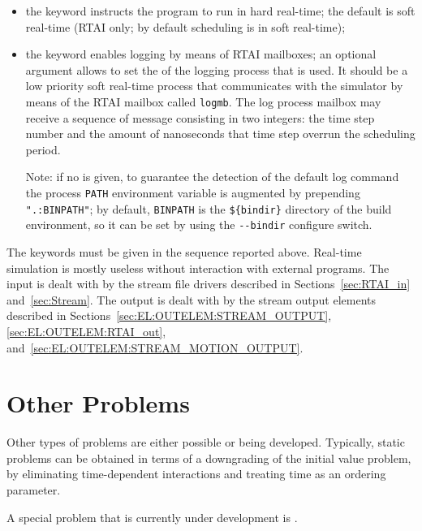 \begin{itemize}
\item the keyword  instructs the program to run
in hard real-time; the default is soft real-time
(RTAI only; by default scheduling is in soft real-time);

\item the keyword  enables logging by means 
of RTAI mailboxes; an optional  argument allows 
to set the  of the logging process that is used.
It should be a low priority soft real-time process that communicates
with the simulator by means of the RTAI mailbox called \texttt{logmb}.
The log process mailbox may receive a sequence of message consisting
in two integers: the time step number and the amount of nanoseconds
that time step overrun the scheduling period.

Note: if no  is given, to guarantee the detection 
of the default log command the process \texttt{PATH} environment variable 
is augmented by prepending \texttt{".:BINPATH"}; by default,
\texttt{BINPATH} is the \verb;${bindir}; directory of the build environment,
so it can be set by using the \verb;--bindir; configure switch.
\end{itemize}
The keywords must be given in the sequence reported above.
Real-time simulation is mostly useless without interaction 
with external programs.
The input is dealt with by the stream file drivers described
in Sections~\ref{sec:RTAI_in} and~\ref{sec:Stream}.
The output is dealt with by the stream output
elements described in Sections~\ref{sec:EL:OUTELEM:STREAM_OUTPUT},
\ref{sec:EL:OUTELEM:RTAI_out},
and~\ref{sec:EL:OUTELEM:STREAM_MOTION_OUTPUT}.

\section{Other Problems}
Other types of problems are either possible or being developed.
Typically, static problems can be obtained in terms of a downgrading
of the initial value problem, by eliminating time-dependent
interactions and treating time as an ordering parameter.

A special problem that is currently under development
is .
